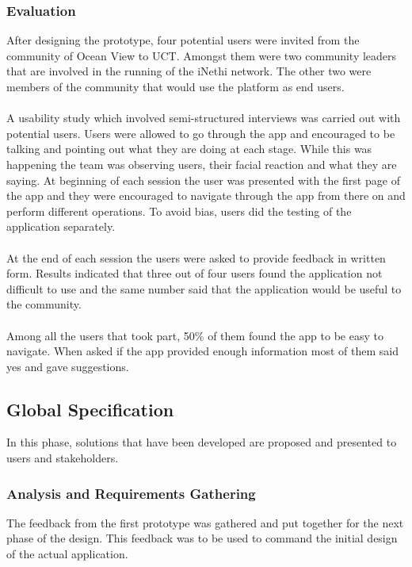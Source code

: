 \subsubsection{Evaluation}
After designing the prototype, four potential users were invited from the community of Ocean View to UCT. Amongst them were two community leaders that are involved in the running of the iNethi network. The other two were members of the community that would use the platform as end users.
\paragraph{}
A usability study which involved semi-structured interviews was carried out with potential users. Users were allowed to go through the app and encouraged to be talking and pointing out what they are doing at each stage. While this was happening the team was observing users, their facial reaction and what they are saying. At beginning of each session the user was presented with the first page of the app and they were encouraged to navigate through the app from there on and perform different operations. To avoid bias, users did the testing of the application separately.
\paragraph{}
At the end of each session the users were asked to provide feedback in written form. Results indicated that three out of four users found the application not difficult to use and the same number said that the application would be useful to the community. 
\paragraph{}
Among all the users that took part, 50\% of them found the app to be easy to navigate. When asked if the app provided enough information most of them said yes and gave suggestions.

\subsection{Global Specification}
In this phase, solutions that have been developed are proposed and presented to users and stakeholders\cite{Kulykinbook}.
\subsubsection{Analysis and Requirements Gathering}
The feedback from the first prototype was gathered and put together for the next phase of the design. This feedback was to be used to command the initial design of the actual application. 
